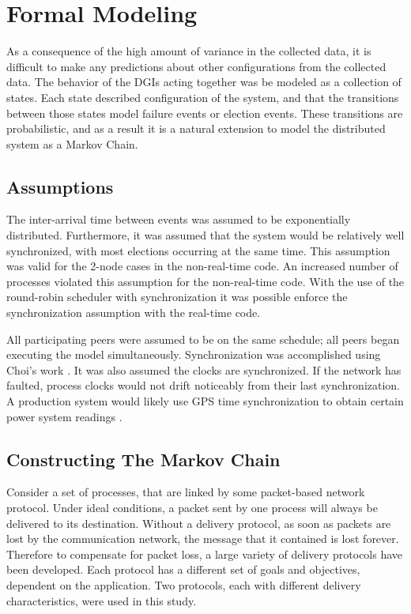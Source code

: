 \section{Formal Modeling}

As a consequence of the high amount of variance in the collected data, it is difficult to make any predictions about other configurations from the collected data.
The behavior of the DGIs acting together was be modeled as a collection of states.
Each state described configuration of the system, and that the transitions between those states model failure events or election events.
These transitions are probabilistic, and as a result it is a natural extension to model the distributed system as a Markov Chain.

\subsection{Assumptions}
The inter-arrival time between events was assumed to be exponentially distributed.
Furthermore, it was assumed that the system would be relatively well synchronized, with most elections occurring at the same time.
This assumption was valid for the 2-node cases in the non-real-time code. 
An increased number of processes violated this assumption for the non-real-time code.
With the use of the round-robin scheduler with synchronization it was possible enforce the synchronization assumption with the real-time code.

All participating peers were assumed to be on the same schedule; all peers began executing the model simultaneously.
Synchronization was accomplished using Choi's work \cite{DCS}.
It was also assumed the clocks are synchronized. 
If the network has faulted, process clocks would not drift noticeably from their last synchronization.
A production system would likely use GPS time synchronization to obtain certain power system readings \cite{PHASORREADINGS}.

\subsection{Constructing The Markov Chain}

Consider a set of processes, that are linked by some packet-based network protocol.
Under ideal conditions, a packet sent by one process  will always be delivered to its destination.
Without a delivery protocol, as soon as packets are lost by the communication network, the message that it contained is lost forever.
Therefore to compensate for packet loss, a large variety of delivery protocols have been developed.
Each protocol has a different set of goals and objectives, dependent on the application.
Two protocols, each with different delivery characteristics, were used in this study.

